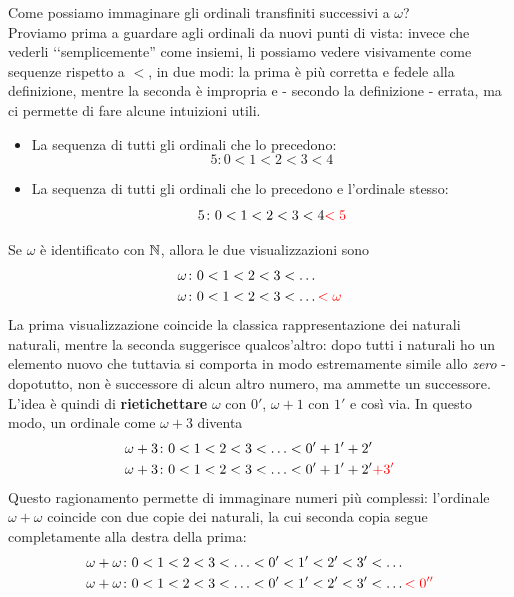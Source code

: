 \begin{intuit}\label{visualizzazioneordinali}
	Come possiamo immaginare gli ordinali transfiniti successivi a $\omega$?\\
	Proviamo prima a guardare agli ordinali da nuovi punti di vista: invece che vederli ‘‘semplicemente'' come insiemi, li possiamo vedere visivamente come sequenze rispetto a $<$, in due modi: la prima è più corretta e fedele alla definizione, mentre la seconda è impropria e - secondo la definizione - errata, ma ci permette di fare alcune intuizioni utili.
	\begin{itemize}
		\item La sequenza di tutti gli ordinali che lo precedono:
		\begin{equation*}
			5\colon 0<1<2<3<4
		\end{equation*}
		\item La sequenza di tutti gli ordinali che lo precedono e l'ordinale stesso:
		\begin{equation*}
			5\colon 0<1<2<3<4\textcolor{red}{<5}
		\end{equation*}
	\end{itemize}
Se $\omega$ è identificato con $\mathbb{N}$, allora le due visualizzazioni sono
	\begin{align*}
		\omega&\colon0<1<2<3<\ldots\\
		\omega&\colon0<1<2<3<\ldots\textcolor{red}{<\omega}
	\end{align*}
La prima visualizzazione coincide la classica rappresentazione dei naturali naturali, mentre la seconda suggerisce qualcos'altro: dopo tutti i naturali ho un elemento nuovo che tuttavia si comporta in modo estremamente simile allo \textit{zero} - dopotutto, non è successore di alcun altro numero, ma ammette un successore.\\
L'idea è quindi di \textbf{rietichettare} $\omega$ con $0'$, $\omega+1$ con $1'$ e così via. In questo modo, un ordinale come $\omega+3$ diventa 
\begin{align*}
	\omega+3&\colon0<1<2<3<\ldots<0'+1'+2'\\
	\omega+3&\colon0<1<2<3<\ldots<0'+1'+2'\textcolor{red}{+3'}
\end{align*}
Questo ragionamento permette di immaginare numeri più complessi: l'ordinale $\omega+\omega$ coincide con due copie dei naturali, la cui seconda copia segue completamente alla destra della prima:
\begin{align*}
	\omega+\omega&\colon0<1<2<3<\ldots<0'<1'<2'<3'<\ldots\\
	\omega+\omega&\colon0<1<2<3<\ldots<0'<1'<2'<3'<\ldots\textcolor{red}{<0''}
\end{align*}
\end{intuit}
